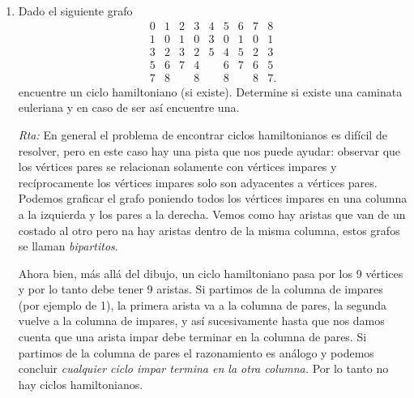 \documentclass[a4paper,12pt,twoside,spanish,reqno]{amsbook}
\numberwithin{equation}{section}
\newcommand{\rta}{\noindent\textit{Rta: }}
\begin{document}
\begin{enumerate}
\begin{enumerate}
        
        
        \item Halle las componentes conexas del grafo (7).
        
        \rta Los subgrafos con vértices $\{1,6,12,9 \}$, $\{4,2,5 \}$ y $\{3,7,11,10,8 \}$ son las componentes conexas de (7).
        
    
    \end{enumerate}

    

    \item\label{ej-ciclo-hamiltoniano} Dado el siguiente grafo
    $$
    \begin{matrix}
    0&1&2&3&4&5&6&7&8\\ \hline
    1&0&1&0&3&0&1&0&1\\
    3&2&3&2&5&4&5&2&3\\
    5&6&7&4& &6&7&6&5\\
    7&8& &8& &8& &8&7.
    \end{matrix}
    $$
    encuentre un ciclo hamiltoniano (si existe). Determine si existe una caminata euleriana y en caso de ser así encuentre una. 
    
    \rta En  general el  problema de encontrar ciclos hamiltonianos es difícil de resolver, pero en este caso hay una pista que nos puede ayudar: observar que los vértices pares se relacionan solamente con vértices impares y recíprocamente los vértices impares solo son adyacentes a vértices pares. Podemos graficar el grafo  poniendo todos los vértices impares en una columna a la izquierda y los pares a la derecha. Vemos como hay aristas que van de un costado al otro pero  na hay aristas dentro de la misma columna, estos grafos se llaman  \textit{bipartitos}.  
    
    \begin{center}
    \end{center}
    Ahora bien, más allá del dibujo, un ciclo hamiltoniano pasa por los 9 vértices y por lo tanto debe tener 9 aristas. Si partimos de la columna de impares (por ejemplo de 1), la primera arista va a la columna de pares, la segunda vuelve a la columna de impares, y  así sucesivamente hasta que nos damos cuenta que una arista impar debe terminar en la columna de pares. Si  partimos de la columna de pares el razonamiento es análogo y podemos concluir \textit{cualquier ciclo impar termina en la otra columna.} Por lo tanto no hay ciclos hamiltonianos. 
    

\end{enumerate}
\end{document}
